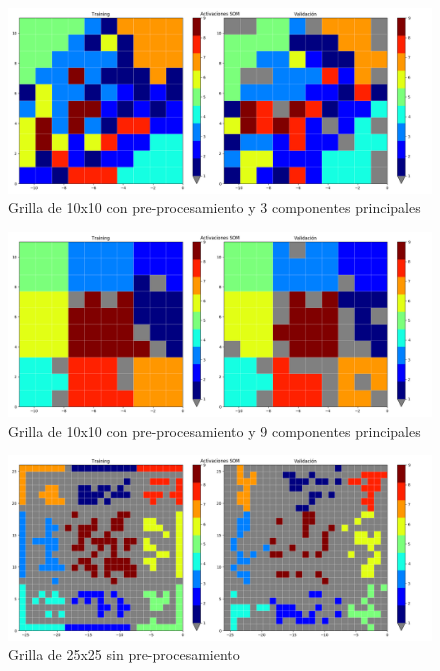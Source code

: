 \begin{figure}[H]
  \includegraphics[width=160mm]{imagenes/som_10_10_3_preprocess.png}
  \caption{Grilla de 10x10 con pre-procesamiento y 3 componentes principales}
\end{figure}

\begin{figure}[H]
  \includegraphics[width=160mm]{imagenes/som_10_10_9_preprocess.png}
  \caption{Grilla de 10x10 con pre-procesamiento y 9 componentes principales}
\end{figure}

\begin{figure}[H]
  \includegraphics[width=160mm]{imagenes/som_25_25.png}
  \caption{Grilla de 25x25 sin pre-procesamiento}
\end{figure}

